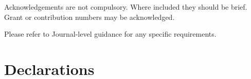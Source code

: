 \documentclass[pdflatex,sn-mathphys-num]{sn-jnl}%
\theoremstyle{thmstyleone}%
\theoremstyle{thmstyletwo}%
\theoremstyle{thmstylethree}%
\begin{document}




Acknowledgements are not compulsory. Where included they should be brief. Grant or contribution numbers may be acknowledged.

Please refer to Journal-level guidance for any specific requirements.

\section*{Declarations}
\end{document}
